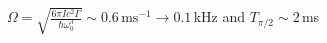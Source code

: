 $\Omega = \sqrt{\frac{6\pi I c^2 \Gamma}{\hbar \omega_0^3} } \sim 0.6\,\text{ms}^{-1} \to 0.1\,$kHz and 
$T_{\pi/2} \sim 2\,$ms